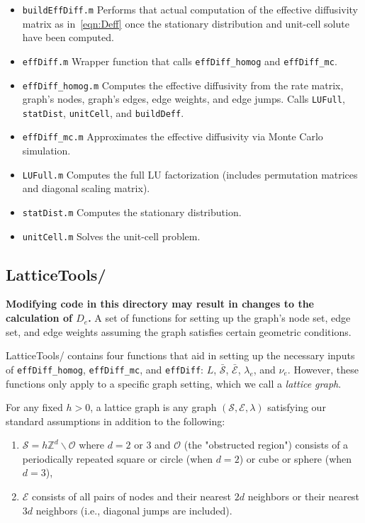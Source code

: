 \documentclass[11pt, oneside]{article}   	%
\theoremstyle{definition}
\newcommand\sS{\mathcal{S}}
\newcommand\sE{\mathcal{E}}
\newcommand\oS{\bar{\sS}}
\newcommand\oE{\bar{\sE}}
\begin{document}
\begin{itemize}
\item \texttt{buildEffDiff.m} Performs that actual computation of the effective diffusivity matrix as in~\eqref{eqn:Deff} once the stationary distribution and unit-cell solute have been computed.
\item \texttt{effDiff.m} Wrapper function that calls \texttt{effDiff\_homog} and \texttt{effDiff\_mc}.
\item \texttt{effDiff\_homog.m} Computes the effective diffusivity from the rate matrix, graph's nodes, graph's edges, edge weights, and edge jumps. Calls \texttt{LUFull}, \texttt{statDist}, \texttt{unitCell}, and \texttt{buildDeff}.
\item \texttt{effDiff\_mc.m} Approximates the effective diffusivity via Monte Carlo simulation.
\item \texttt{LUFull.m} Computes the full LU factorization (includes permutation matrices and diagonal scaling matrix).
\item \texttt{statDist.m} Computes the stationary distribution.
\item \texttt{unitCell.m} Solves the unit-cell problem.
\end{itemize}

\subsection{LatticeTools/}
{\bf Modifying code in this directory may result in changes to the calculation of $D_e$.} A set of functions for setting up the graph's node set, edge set, and edge weights assuming the graph satisfies certain geometric conditions.

LatticeTools/ contains four functions that aid in setting up the necessary inputs of \texttt{effDiff\_homog}, \texttt{effDiff\_mc}, and \texttt{effDiff}: $L$, $\oS$, $\oE$, $\lambda_e$, and $\nu_e$. However, these functions only apply to a specific graph setting, which we call a \emph{lattice graph}.

For any fixed $h > 0$, a lattice graph is any graph $(\sS,\sE,\lambda)$ satisfying our standard assumptions in addition to the following:
\begin{enumerate}
	\item $\sS = h\mathbb{Z}^d \backslash \mathcal{O}$ where $d = 2$ or $3$ and $\mathcal{O}$ (the "obstructed region") consists of a periodically repeated square or circle (when $d = 2$) or cube or sphere (when $d = 3$),
	\item $\sE$ consists of all pairs of nodes and their nearest $2d$ neighbors or their nearest $3d$ neighbors (i.e., diagonal jumps are included).
\end{enumerate}
\end{document}
